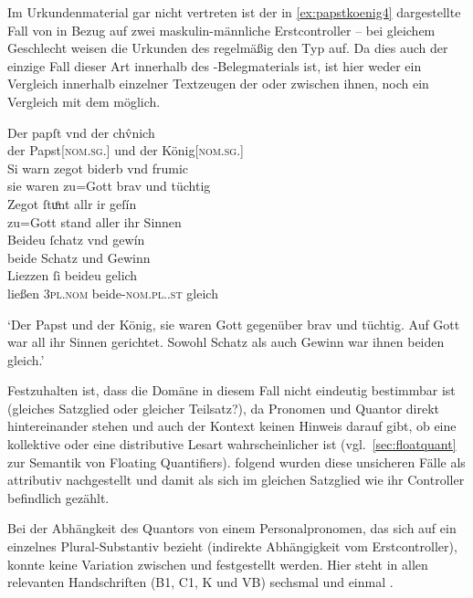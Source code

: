 Im Urkundenmaterial gar nicht vertreten ist der in \cref{ex:papstkoenig4}
dargestellte Fall von  in Bezug auf zwei maskulin-männliche
Erstcontroller -- bei gleichem Geschlecht weisen die Urkunden des
\CAO{} regelmäßig den Typ  auf. Da dies auch der einzige
Fall dieser Art innerhalb des \KC{}-Belegmaterials ist, ist hier weder
ein Vergleich innerhalb einzelner Textzeugen der \KC{} oder zwischen
ihnen, noch ein Vergleich mit dem \CAO{} möglich.

\begin{exe}
\ex\label{ex:papstkoenig4} %
	\gll Der papſt vnd der chv̂nich \\
		der Papst[\textsc{nom.sg.\MascM}] und der König[\textsc{nom.sg.\MascM}] \\
\sn \gll Si warn zegot biderb vnd frumic \\
		sie waren {zu=Gott} brav und tüchtig \\
\sn \gll Zegot ſtuͦnt allr ir geſín \\
		{zu=Gott} stand aller ihr Sinnen \\
\sn \gll Beideu ſchatz vnd gewín \\
		beide Schatz und Gewinn \\
\sn \gll Liezzen ſi beideu gelich \\
		ließen \textsc{3pl\subM.nom} beide-\textsc{nom.pl.\NeutM.st} gleich \\
	\begin{taggedline}{\parencites[\pno~17vb,30--34]{kc:B1}[vgl. abweichend][6110--6113]{schroeder1895}}
	\trans `Der Papst und der König, sie waren Gott gegenüber brav und
		tüchtig. Auf Gott war all ihr Sinnen gerichtet. Sowohl Schatz als auch
		Gewinn war ihnen beiden gleich.'
	\end{taggedline}
\end{exe}

Festzuhalten ist, dass die Domäne in diesem Fall nicht eindeutig bestimmbar ist
(gleiches Satzglied oder gleicher Teilsatz?), da Pronomen und Quantor direkt
hintereinander stehen und auch der Kontext keinen Hinweis darauf gibt, ob eine
kollektive oder eine distributive Lesart wahrscheinlicher ist
(vgl.~\cref{sec:floatquant} zur Semantik von Floating Quantifiers).
\citet[623]{ksw2} folgend wurden diese unsicheren Fälle als attributiv
nachgestellt und damit als sich im gleichen Satzglied wie ihr Controller
befindlich gezählt.

Bei der Abhängkeit des Quantors von einem Personalpronomen, das sich auf ein
einzelnes Plural-Substantiv bezieht (indirekte Abhängigkeit vom
Erstcontroller), konnte keine Variation zwischen  und 
festgestellt werden. Hier steht in allen relevanten Handschriften
(B1, C1, K und VB) sechsmal
 und einmal  \autocites(zu insgesamt vier
Stellen)[\pno~31va,30--31]{kc:B1}.

